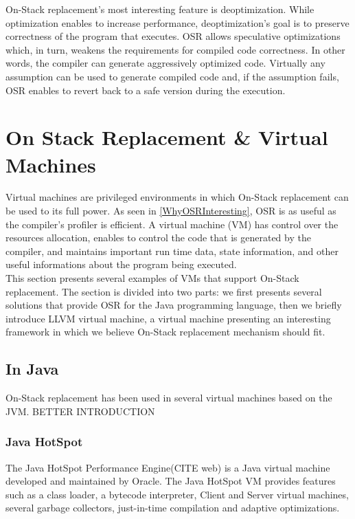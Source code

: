 On-Stack replacement's most interesting feature is deoptimization. 
While optimization enables to increase performance, deoptimization's goal is to preserve correctness of the program that executes.
OSR allows speculative optimizations which, in turn, weakens the requirements for compiled code correctness. 
In other words, the compiler can generate aggressively optimized code. 
Virtually any assumption can be used to generate compiled code and, if the assumption fails, 
OSR enables to revert back to a safe version during the execution.\\

\section{On Stack Replacement \& Virtual Machines}
Virtual machines are privileged environments in which On-Stack replacement can be used to its full power.
As seen in \ref{WhyOSRInteresting}, OSR is as useful as the compiler's profiler is efficient.
A virtual machine (VM) has control over the resources allocation, enables to control the code that is generated by the compiler, and maintains important run time data, state information, and other useful informations about the program being executed.\\

This section presents several examples of VMs that support On-Stack replacement. 
The section is divided into two parts: we first presents several solutions that provide OSR for  the Java programming language, then we briefly introduce LLVM virtual machine, a virtual machine presenting an interesting framework in which we believe On-Stack replacement mechanism should fit.\\ 
\subsection{In Java}
On-Stack replacement has been used in several virtual machines based on the JVM.
BETTER INTRODUCTION\\

\subsubsection{Java HotSpot}
The Java HotSpot Performance Engine(CITE web) is a Java virtual machine developed and maintained by Oracle.
The Java HotSpot VM provides features such as a class loader, a bytecode interpreter, Client and Server virtual machines, several garbage collectors, just-in-time compilation and adaptive optimizations.\\

